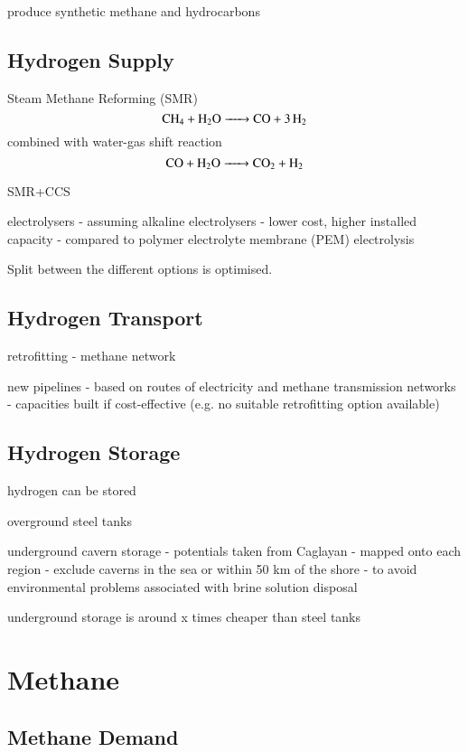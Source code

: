 produce synthetic methane and hydrocarbons

\subsection{Hydrogen Supply}

Steam Methane Reforming (SMR)
\begin{equation}
    \ce{ CH4 + H2O -> CO + 3H2 }
\end{equation}
combined with water-gas shift reaction
\begin{equation}
    \ce{CO + H2O -> CO2 + H2}
\end{equation}


SMR+CCS

electrolysers
- assuming alkaline electrolysers
- lower cost, higher installed capacity
- compared to polymer electrolyte membrane (PEM) electrolysis

Split between the different options is optimised.


\subsection{Hydrogen Transport}

retrofitting
- methane network

new pipelines
- based on routes of electricity and methane transmission networks
- capacities built if cost-effective (e.g. no suitable retrofitting option available)

\subsection{Hydrogen Storage}

hydrogen can be stored

overground steel tanks

underground cavern storage
- potentials taken from Caglayan
- mapped onto each region
- exclude caverns in the sea or within 50 km of the shore
- to avoid environmental problems associated with brine solution disposal

underground storage is around x times cheaper than steel tanks

\section{Methane}

\subsection{Methane Demand}

